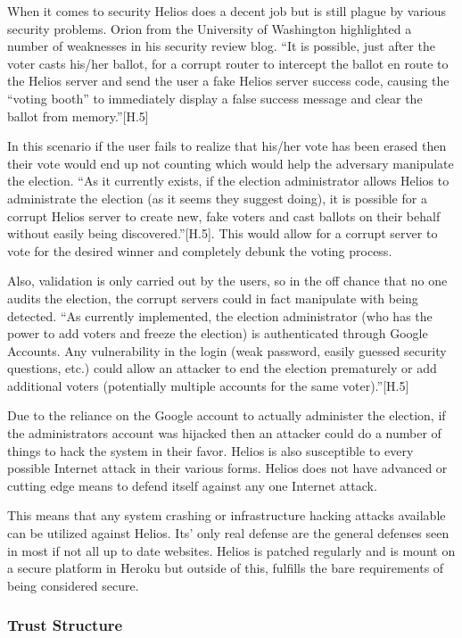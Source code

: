 When it comes to security Helios does a decent job but is still plague by various security problems. Orion from the University of Washington highlighted a number of weaknesses in his security review blog. ``It is possible, just after the voter casts his/her ballot, for a corrupt router to intercept the ballot en route to the Helios server and send the user a fake Helios server success code, causing the ``voting booth'' to immediately display a false success message and clear the ballot from memory.''[H.5]

In this scenario if the user fails to realize that his/her vote has been erased then their vote would end up not counting which would help the adversary manipulate the election. ``As it currently exists, if the election administrator allows Helios to administrate the election (as it seems they suggest doing), it is possible for a corrupt Helios server to create new, fake voters and cast ballots on their behalf without easily being discovered.''[H.5]. This would allow for a corrupt server to vote for the desired winner and completely debunk the voting process.

Also, validation is only carried out by the users, so in the off chance that no one audits the election, the corrupt servers could in fact manipulate with being detected. ``As currently implemented, the election administrator (who has the power to add voters and freeze the election) is authenticated through Google Accounts. Any vulnerability in the login (weak password, easily guessed security questions, etc.) could allow an attacker to end the election prematurely or add additional voters (potentially multiple accounts for the same voter).''[H.5]

Due to the reliance on the Google account to actually administer the election, if the administrators account was hijacked then an attacker could do a number of things to hack the system in their favor. Helios is also susceptible to every possible Internet attack in their various forms. Helios does not have advanced or cutting edge means to defend itself against any one Internet attack.

This means that any system crashing or infrastructure hacking attacks available can be utilized against Helios. Its' only real defense are the general defenses seen in most if not all up to date websites. Helios is patched regularly and is mount on a secure platform in Heroku but outside of this, fulfills the bare requirements of being considered secure.

\subsubsection{Trust Structure}

